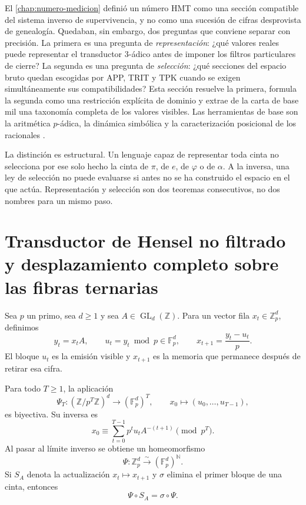 \label{chap:cobertura-taxonomia-numeros}

El \cref{chap:numero-medicion} definió un número HMT como una sección
compatible del sistema inverso de supervivencia, y no como una sucesión de
cifras desprovista de genealogía. Quedaban, sin embargo, dos preguntas que
conviene separar con precisión. La primera es una pregunta de
\emph{representación}: ¿qué valores reales puede representar el transductor
3-ádico antes de imponer los filtros particulares de cierre? La segunda es
una pregunta de \emph{selección}: ¿qué secciones del espacio bruto quedan
escogidas por APP, TRIT y TPK cuando se exigen simultáneamente sus
compatibilidades? Esta sección resuelve la primera, formula la segunda como
una restricción explícita de dominio y extrae de la carta de base mil una
taxonomía completa de los valores visibles. Las herramientas de base son la
aritmética \(p\)-ádica, la dinámica simbólica y la caracterización posicional
de los racionales \cite{Koblitz1984,LindMarcus1995,HardyWright2008}.

La distinción es estructural. Un lenguaje capaz de representar toda cinta no
selecciona por ese solo hecho la cinta de \(\pi\), de \(e\), de \(\varphi\) o
de \(\alpha\). A la inversa, una ley de selección no puede evaluarse si antes
no se ha construido el espacio en el que actúa. Representación y selección
son dos teoremas consecutivos, no dos nombres para un mismo paso.

\section{Transductor de Hensel no filtrado y desplazamiento completo sobre las fibras ternarias}

Sea \(p\) un primo, sea \(d\geq1\) y sea
\(A\in\operatorname{GL}_d(\mathbb Z)\). Para un vector fila
\(x_t\in\mathbb Z_p^d\), definimos
\begin{equation}
 y_t=x_tA,
 \qquad
 u_t=y_t\bmod p\in\mathbb F_p^d,
 \qquad
 x_{t+1}=\frac{y_t-u_t}{p}.
 \label{eq:transductor-hensel-general}
\end{equation}
El bloque \(u_t\) es la emisión visible y \(x_{t+1}\) es la memoria que
permanece después de retirar esa cifra.

\begin{theorem}
\label{thm:shift-hensel-completo}
Para todo \(T\geq1\), la aplicación
\[
 \Psi_T:(\mathbb Z/p^T\mathbb Z)^d
 \longrightarrow(\mathbb F_p^d)^T,
 \qquad
 x_0\longmapsto(u_0,\ldots,u_{T-1}),
\]
es biyectiva. Su inversa es
\begin{equation}
 x_0\equiv
 \sum_{t=0}^{T-1}p^t u_tA^{-(t+1)}
 \pmod {p^T}.
 \label{eq:inversa-hensel-finita}
\end{equation}
Al pasar al límite inverso se obtiene un homeomorfismo
\[
 \Psi:\mathbb Z_p^d\xrightarrow{\ \sim\ }
 (\mathbb F_p^d)^{\mathbb N}.
\]
Si \(S_A\) denota la actualización \(x_t\mapsto x_{t+1}\) y
\(\sigma\) elimina el primer bloque de una cinta, entonces
\[
 \Psi\circ S_A=\sigma\circ\Psi.
\]
\end{theorem}

